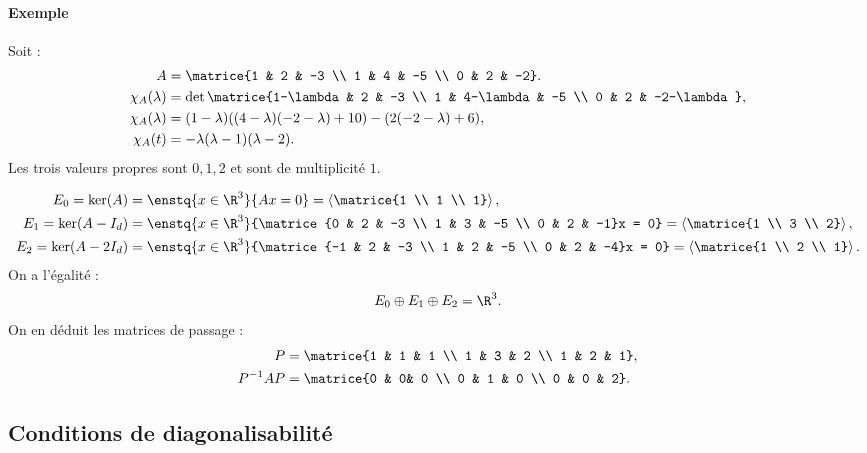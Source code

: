 \paragraph{Exemple}Soit :
\begin{align*}
A &= \matrice{1 & 2 & -3 \\ 1 & 4 & -5 \\ 0 & 2 & -2}.\\
\chi_A(\lambda) &= \det\matrice{1-\lambda & 2 & -3 \\ 1 & 4-\lambda & -5 \\ 0 & 2 & -2-\lambda},\\
\chi_A(\lambda) &= (1-\lambda)((4-\lambda)(-2-\lambda)+10) - (2(-2-\lambda)+6),\\
\chi_A(t) &= -\lambda(\lambda-1)(\lambda-2).
\end{align*}
Les trois valeurs propres sont $0,1,2$ et sont de multiplicité $1$.

\begin{align*}
E_0 = \ker (A) &= \enstq{x\in \R^{3}}{Ax = 0} = \left\langle \matrice{1 \\ 1 \\ 1}\right\rangle,\\
E_1 = \ker (A-I_d) &= \enstq{x\in \R^{3}}{\matrice{0 & 2 & -3 \\ 1 & 3 & -5 \\ 0 & 2 & -1}x = 0} =\left\langle\matrice{1 \\ 3 \\ 2} \right\rangle,\\
E_2 = \ker(A-2I_d) &= \enstq{x\in \R^{3}}{\matrice{-1 & 2 & -3 \\ 1 & 2 & -5 \\ 0 & 2 & -4}x = 0} = \left\langle \matrice{1 \\ 2 \\ 1}\right\rangle.
\end{align*}
On a l'égalité : \[ E_0 \oplus E_1 \oplus E_2 = \R^{3}.\]
On en déduit les matrices de passage : 
\begin{align*}
P &= \matrice{1 & 1 & 1 \\ 1 & 3 & 2 \\ 1 & 2 & 1}, \\
P^{-1}AP &= \matrice{0 & 0& 0 \\ 0 & 1 & 0 \\ 0 & 0 & 2}.
\end{align*}
\subsection{Conditions de diagonalisabilité}
